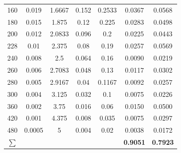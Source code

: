 \begin{table}[htbp]
\begin{tabular}{ccccccc}
        160                                 & 0.019          & 1.6667            & 0.152                & 0.2533                   & 0.0367                       & 0.0568                                  \\
        180                                 & 0.015          & 1.875             & 0.12                 & 0.225                    & 0.0283                       & 0.0498                                  \\
        200                                 & 0.012          & 2.0833            & 0.096                & 0.2                      & 0.0225                       & 0.0443                                  \\
        228                                 & 0.01           & 2.375             & 0.08                 & 0.19                     & 0.0257                       & 0.0569                                  \\
        240                                 & 0.008          & 2.5               & 0.064                & 0.16                     & 0.0090                       & 0.0219                                  \\
        260                                 & 0.006          & 2.7083            & 0.048                & 0.13                     & 0.0117                       & 0.0302                                  \\
        280                                 & 0.005          & 2.9167            & 0.04                 & 0.1167                   & 0.0092                       & 0.0257                                  \\
        300                                 & 0.004          & 3.125             & 0.032                & 0.1                      & 0.0075                       & 0.0226                                  \\
        360                                 & 0.002          & 3.75              & 0.016                & 0.06                     & 0.0150                       & 0.0500                                  \\
        420                                 & 0.001          & 4.375             & 0.008                & 0.035                    & 0.0075                       & 0.0297                                  \\
        480                                 & 0.0005         & 5                 & 0.004                & 0.02                     & 0.0038                       & 0.0172                                  \\ \midrule
        \rowcolor{green!15} \textbf{$\sum$} &                &                   &                      &                          & \textbf{0.9051}              & \textbf{0.7923}                         \\ \bottomrule
    \end{tabular}


\end{table}
